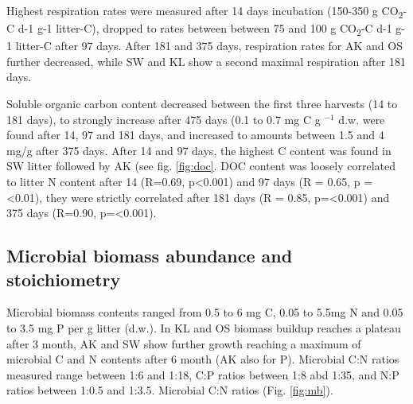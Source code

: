\documentclass[10pt]{article}
\begin{document}
Highest respiration rates were measured after 14 days incubation (150-350 \textmu g CO\textsubscript{2}-C d-1 g-1 litter-C), dropped to rates between between 75 and 100 \textmu g CO\textsubscript{2}-C d-1 g-1 litter-C after 97 days. After 181 and 375 days, respiration rates for AK and OS further decreased, while SW and KL show a second maximal respiration after 181 days. %

Soluble organic carbon content decreased between the first three harvests (14 to 181 days), to strongly increase after 475 days (0.1 to 0.7 mg C g $^{-1}$ d.w. were found after 14, 97 and 181 days, and increased to amounts between 1.5 and 4 mg/g after 375 days. After 14 and 97 days, the highest C content was found in SW litter followed by AK (see fig. \ref{fig:doc}. DOC content was loosely correlated to litter N content after 14 (R=0.69, p\textless  0.001) and 97 days (R = 0.65, p =\textless  0.01), they were strictly correlated after 181 days (R = 0.85, p=\textless  0.001) and 375 days (R=0.90, p=\textless  0.001).



\subsection*{Microbial biomass abundance and stoichiometry}

Microbial biomass contents ranged from 0.5 to 6 mg C, 0.05 to 5.5mg N and 0.05 to 3.5 mg P per g litter (d.w.). In KL and OS biomass buildup reaches a plateau after 3 month, AK and SW show further growth reaching a maximum of microbial C and N contents after 6 month (AK also for P). Microbial C:N ratios measured range between 1:6 and 1:18, C:P ratios between 1:8 abd 1:35, and N:P ratios between 1:0.5 and 1:3.5. Microbial C:N ratios (Fig. \ref{fig:mb}).
\end{document}
